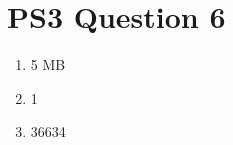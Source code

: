 \documentclass{article}
\begin{document}
\section{PS3 Question 6}

\begin{enumerate}
\item 5 MB
\item 1
\item 36634
\end{enumerate}
\end{document}

